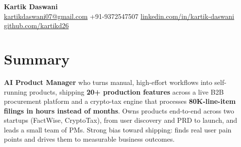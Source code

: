 \documentclass[10pt,a4paper]{article}
\begin{document}
\begin{center}
    {\LARGE \textbf{Kartik Daswani}} \\
    \href{mailto:kartikdaswani07@gmail.com}{kartikdaswani07@gmail.com} \quad
    +91-9372547507 \quad
    \href{https://linkedin.com/in/kartik-daswani}{linkedin.com/in/kartik-daswani} \quad
    \href{https://github.com/kartikd26}{github.com/kartikd26}
\end{center}

\vspace{0.1cm}

\section*{Summary}
\textbf{AI Product Manager} who turns manual, high-effort workflows into self-running products, shipping \textbf{20+ production features} across a live B2B procurement platform and a crypto-tax engine that processes \textbf{80K-line-item filings in hours instead of months}. Owns products end-to-end across two startups (FactWise, CryptoTax), from user discovery and PRD to launch, and leads a small team of PMs. Strong bias toward shipping: finds real user pain points and drives them to measurable business outcomes.

\end{document}
